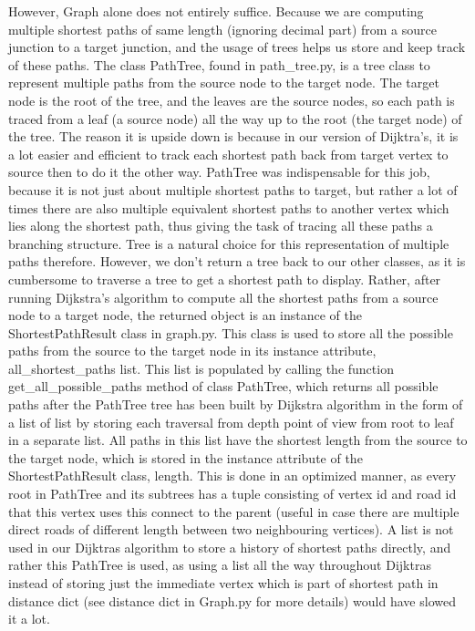 \documentclass[fontsize=11pt]{article}
\begin{document}
However, Graph alone does not entirely suffice. Because we are computing multiple shortest paths of same length (ignoring decimal part) from a source junction to a target junction, and the usage of trees helps us store and keep track of these paths. The class PathTree, found in path\_tree.py,  is a tree class to represent multiple paths from the source node to the target node. The target node is the root of the tree, and the leaves are the source nodes, so each path is traced from a leaf (a source node) all the way up to the root (the target node) of the tree. The reason it is upside down is because in our version of Dijktra's, it is a lot easier and efficient to track each shortest path back from target vertex to source then to do it the other way. PathTree was indispensable for this job, because it is not just about multiple shortest paths to target, but rather a lot of times there are also multiple equivalent shortest paths to another vertex which lies along the shortest path, thus giving the task of tracing all these paths a branching structure. Tree is a natural choice for this representation of multiple paths therefore. However, we don't return a tree back to our other classes, as it is cumbersome to traverse a tree to get a shortest path to display. Rather, after running Dijkstra’s algorithm to compute all the shortest paths from a source node to a target node, the returned object is an instance of the ShortestPathResult class in graph.py. This class is used to store all the possible paths from the source to the target node in its instance attribute, all\_shortest\_paths list. This list is populated by calling the function get\_all\_possible\_paths method of class PathTree, which returns all possible paths after the PathTree tree has been built by Dijkstra algorithm in the form of a list of list by storing each traversal from depth point of view from root to leaf in a separate list. All paths in this list have the shortest length from the source to the target node, which is stored in the instance attribute of the ShortestPathResult class, length. This is done in an optimized manner, as every root in PathTree and its subtrees has a tuple consisting of vertex id and road id that this vertex uses this connect to the parent (useful in case there are multiple direct roads of different length between two neighbouring vertices). A list is not used in our Dijktras algorithm to store a history of shortest paths directly, and rather this PathTree is used, as using a list all the way throughout Dijktras instead of storing just the immediate vertex which is part of shortest path in distance dict (see distance dict in Graph.py for more details) would have slowed it a lot. \\
\end{document}

